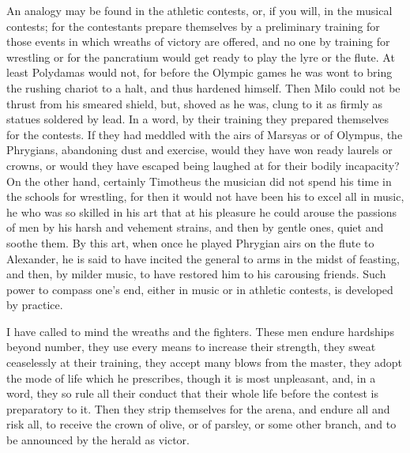\documentclass[a4paper]{article}
\begin{document}
An analogy may be found in the athletic contests, or, if you will, in the musical contests; for the contestants prepare themselves by a preliminary training for those events in which wreaths of victory are offered, and no one by training for wrestling or for the pancratium would get ready to play the lyre or the flute. At least Polydamas would not, for before the Olympic games he was wont to bring the rushing chariot to a halt, and thus hardened himself. Then Milo could not be thrust from his smeared shield, but, shoved as he was, clung to it as firmly as statues soldered by lead. In a word, by their training they prepared themselves for the contests. If they had meddled with the airs of Marsyas or of Olympus, the Phrygians, abandoning dust and exercise, would they have won ready laurels or crowns, or would they have escaped being laughed at for their bodily incapacity? On the other hand, certainly Timotheus the musician did not spend his time in the schools for wrestling, for then it would not have been his to excel all in music, he who was so skilled in his art that at his pleasure he could arouse the passions of men by his harsh and vehement strains, and then by gentle ones, quiet and soothe them. By this art, when once he played Phrygian airs on the flute to Alexander, he is said to have incited the general to arms in the midst of feasting, and then, by milder music, to have restored him to his carousing friends. Such power to compass one's end, either in music or in athletic contests, is developed by practice.

I have called to mind the wreaths and the fighters. These men endure hardships beyond number, they use every means to increase their strength, they sweat ceaselessly at their training, they accept many blows from the master, they adopt the mode of life which he prescribes, though it is most unpleasant, and, in a word, they so rule all their conduct that their whole life before the contest is preparatory to it. Then they strip themselves for the arena, and endure all and risk all, to receive the crown of olive, or of parsley, or some other branch, and to be announced by the herald as victor.
\end{document}
